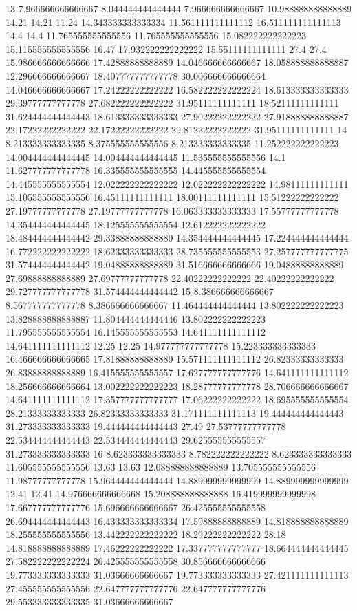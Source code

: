 13 7.966666666666667 8.044444444444444 7.966666666666667 10.988888888888889 14.21 14.21 11.24 14.343333333333334 11.561111111111112 16.511111111111113 14.4 14.4 11.765555555555556 11.765555555555556 15.082222222222223 15.115555555555556 16.47 17.932222222222222 15.55111111111111 27.4 27.4 15.986666666666666 17.42888888888889 14.046666666666667 18.058888888888887 12.296666666666667 18.407777777777778 30.006666666666664 14.046666666666667 17.24222222222222 16.582222222222224 18.613333333333333 29.39777777777778 27.682222222222222 31.95111111111111 18.52111111111111 31.624444444444443 18.613333333333333 27.90222222222222 27.918888888888887 22.17222222222222 22.17222222222222 29.81222222222222 31.95111111111111
14 8.213333333333335 8.375555555555556 8.213333333333335 11.252222222222223 14.004444444444445 14.004444444444445 11.535555555555556 14.1 11.627777777777778 16.335555555555555 14.445555555555554 14.445555555555554 12.022222222222222 12.022222222222222 14.98111111111111 15.105555555555556 16.45111111111111 18.00111111111111 15.51222222222222 27.19777777777778 27.19777777777778 16.063333333333333 17.55777777777778 14.354444444444445 18.125555555555554 12.612222222222222 18.484444444444442 29.33888888888889 14.354444444444445 17.224444444444444 16.772222222222222 18.62333333333333 28.735555555555553 27.257777777777775 31.574444444444442 19.04888888888889 31.516666666666666 19.04888888888889 27.69888888888889 27.69777777777778 22.40222222222222 22.40222222222222 29.727777777777778 31.574444444444442
15 8.386666666666667 8.567777777777778 8.386666666666667 11.464444444444444 13.802222222222223 13.828888888888887 11.804444444444446 13.802222222222223 11.795555555555554 16.145555555555553 14.641111111111112 14.641111111111112 12.25 12.25 14.977777777777778 15.223333333333333 16.466666666666665 17.81888888888889 15.571111111111112 26.82333333333333 26.83888888888889 16.415555555555557 17.627777777777776 14.641111111111112 18.256666666666664 13.002222222222223 18.28777777777778 28.706666666666667 14.641111111111112 17.357777777777777 17.06222222222222 18.695555555555554 28.21333333333333 26.82333333333333 31.171111111111113 19.444444444444443 31.273333333333333 19.444444444444443 27.49 27.53777777777778 22.534444444444443 22.534444444444443 29.625555555555557 31.273333333333333
16 8.623333333333333 8.782222222222222 8.623333333333333 11.605555555555556 13.63 13.63 12.088888888888889 13.705555555555556 11.98777777777778 15.964444444444444 14.889999999999999 14.889999999999999 12.41 12.41 14.976666666666668 15.208888888888888 16.419999999999998 17.667777777777776 15.696666666666667 26.425555555555558 26.694444444444443 16.433333333333334 17.59888888888889 14.818888888888889 18.255555555555556 13.442222222222222 18.29222222222222 28.18 14.818888888888889 17.46222222222222 17.337777777777777 18.664444444444445 27.582222222222224 26.425555555555558 30.856666666666666 19.773333333333333 31.03666666666667 19.773333333333333 27.421111111111113 27.455555555555556 22.647777777777776 22.647777777777776 29.553333333333335 31.03666666666667
